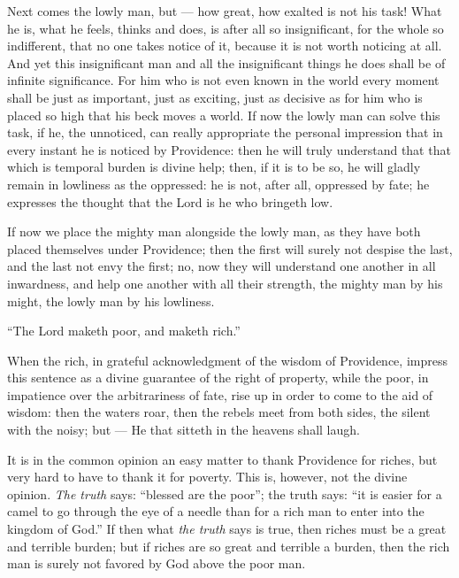 \documentclass[12pt,a4paper,openany]{book}
\newcommand{\opage}[1]{\marginnote{\footnotesize\textit{[#1]}}}
\begin{document}
Next comes the lowly man, but --- how great,
how exalted is not his task! What he
is, what he feels, thinks and does, is after all
so insignificant, for the whole so indifferent,
that no one takes notice of it, because it is not
worth noticing at all. And yet this
insignificant man and all the insignificant things he does shall
be of infinite significance. For him who is not
even known in the world every moment shall be
just as important, just as exciting, just as decisive
as for him who is placed so high that
his beck moves a world. If now
the lowly man can solve this task, if he, the
unnoticed, can really appropriate the personal
impression that in every instant he is noticed by Providence: then he will truly understand that that which
\setcounter{footnote}{0}%
\opage{61}is temporal burden is divine help;
then, if it is to be so, he will gladly remain
in lowliness as the oppressed: he is not, after all,
oppressed by fate; he expresses the thought
that the Lord is he who bringeth low.

If now we place the mighty man alongside the
lowly man, as they have both placed
themselves under Providence; then the first will surely not
despise the last, and the last not envy
the first; no, now they will understand one another
in all inwardness, and help one another with all their strength,
the mighty man by his might, the lowly man by
his lowliness.

``The Lord maketh poor, and maketh
rich.''

When the rich, in grateful acknowledgment of
the wisdom of Providence, impress this sentence
as a divine guarantee of the right of property,
while the poor, in impatience over the arbitrariness
of fate, rise up in order to come to the aid of wisdom:
then the waters roar, then
the rebels meet from both sides, the silent with
the noisy; but --- He that sitteth in the heavens
shall laugh.

It is in the common opinion an easy
\setcounter{footnote}{0}%
\opage{62}matter to thank Providence for riches, but very
hard to have to thank it for poverty. This
is, however, not the divine opinion.
\emph{The truth} says: ``blessed are the poor'';
the truth says: ``it is easier for a camel
to go through the eye of a needle than for a
rich man to enter into the kingdom of God.'' If then
what \emph{the truth} says is true, then
riches must be a great and terrible burden;
but if riches are so great and terrible
a burden, then the rich man is surely not favored
by God above the poor man.
\end{document}
